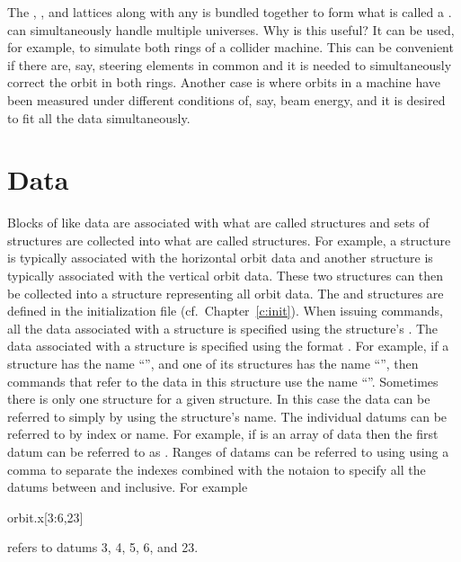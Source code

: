 The , , and  lattices along with any
 is bundled together to form what is called a
. \tao can simultaneously handle multiple universes. Why
is this useful? It can be used, for example, to simulate both rings of
a collider machine. This can be convenient if there are, say, steering
elements in common and it is needed to simultaneously correct the
orbit in both rings. Another case is where orbits in a machine have
been measured under different conditions of, say, beam energy, and it
is desired to fit all the data simultaneously.

\section{Data}

Blocks of like data are associated with what are called 
structures and sets of  structures are collected into what
are called  structures. For example, a 
structure is typically associated with the horizontal orbit data and
another  structure is typically associated with the
vertical orbit data. These two structures can then be collected into a
 structure representing all orbit data. The 
and  structures are defined in the \tao initialization
file (cf.~Chapter~\ref{c:init}).  When issuing \tao commands, all the
data associated with a  structure is specified using the
 structure's .  The data associated with a
 structure is specified using the format
. For example, if a  structure has the
name ``'', and one of its  structures has the
name ``'', then \tao commands that refer to the data in this
 structure use the name ``''. Sometimes there
is only one  structure for a given 
structure. In this case the data can be referred to simply by using
the  structure's name. The individual datums can be
referred to by index or name. For example, if  is an array
of data then the first datum can be referred to as
. Ranges of datams can be referred to using using a
comma \vn{,} to separate the indexes combined with the notaion
 to specify all the datums between  and 
inclusive. For example
\begin{example}
  orbit.x[3:6,23]
\end{example}
refers to datums 3, 4, 5, 6, and 23. 

